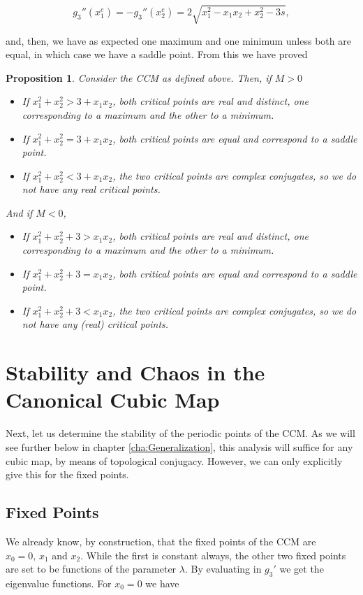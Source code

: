 \documentclass[10pt,twoside,titlepage]{book}
\numberwithin{equation}{chapter}
\numberwithin{figure}{chapter}
\numberwithin{table}{chapter}
\theoremstyle{plain}%
\newtheorem{prop}[thm]{Proposition}
\theoremstyle{definition}
\theoremstyle{remark}
\begin{document}
\[g_3''(x_1^c)=-g_3''(x_2^c)=2\sqrt{x_1^2-x_1x_2+x_2^2-3s},\]

and, then, we have as expected one maximum and one minimum unless both are equal, in which case we have a saddle point. From this we have proved

\begin{prop}
	Consider the CCM as defined above. Then, if $M>0$
	\begin{itemize}
		\item If $x_1^2+x_2^2>3+x_1x_2$, both critical points are real and distinct, one corresponding to a maximum and the other to a minimum.
		\item If $x_1^2+x_2^2=3+x_1x_2$, both critical points are equal and correspond to a saddle point.
		\item If $x_1^2+x_2^2<3+x_1x_2$, the two critical points are complex conjugates, so we do not have any real critical points.
	\end{itemize}
	And if $M<0$,
	\begin{itemize}
		\item If $x_1^2+x_2^2+3>x_1x_2$, both critical points are real and distinct, one corresponding to a maximum and the other to a minimum.
		\item If $x_1^2+x_2^2+3=x_1x_2$, both critical points are equal and correspond to a saddle point.
		\item If $x_1^2+x_2^2+3<x_1x_2$, the two critical points are complex conjugates, so we do not have any (real) critical points.
	\end{itemize}
\end{prop}

\section{Stability and Chaos in the Canonical Cubic Map}
\label{sec:Stability&ChaosCCM}

Next, let us determine the stability of the periodic points of the CCM. As we will see further below in chapter \ref{cha:Generalization}, this analysis will suffice for any cubic map, by means of topological conjugacy. However, we can only explicitly give this for the fixed points.

\subsection{Fixed Points}
We already know, by construction, that the fixed points of the CCM are $x_0=0,\,x_1$ and $x_2$. While the first is constant always, the other two fixed points are set to be functions of the parameter $\lambda$. By evaluating in $g_3'$ we get the eigenvalue functions. For $x_0=0$ we have
\end{document}
